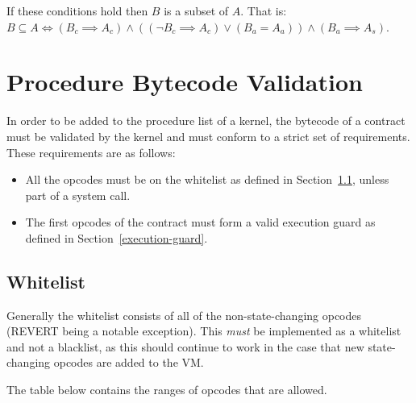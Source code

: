 \documentclass[english,a4paper]{article}
\begin{document}
If these conditions hold then $B$ is a subset of $A$. That is: $B \subseteq A
\iff \left(B_c \implies A_c\right) \land ((\lnot B_c \implies A_c) \lor (B_a =
A_a)) \land (B_a \implies A_s)$.

\section{Procedure Bytecode Validation}\label{bytecode-validation}
In order to be added to the procedure list of a kernel, the bytecode of a
contract must be validated by the kernel and must conform to a strict set of
requirements. These requirements are as follows:

\begin{itemize}
  \item All the opcodes must be on the whitelist as defined in Section~\ref{opcode-whitelist}, unless part
  of a system call.
  \item The first opcodes of the contract must form a valid execution guard as
  defined in Section~\ref{execution-guard}.
\end{itemize}


\subsection{Whitelist}\label{opcode-whitelist}
Generally the whitelist consists of all of the non-state-changing opcodes (REVERT being a notable exception). This
\emph{must} be implemented as a whitelist and not a blacklist, as this should
continue to work in the case that new state-changing opcodes are added to the
VM.

The table below contains the ranges of opcodes that are allowed.
\end{document}
